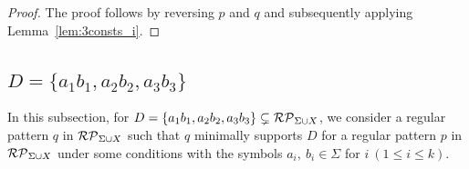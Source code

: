 \begin{proof}
%
%
The proof follows by reversing $p$ and $q$ and subsequently applying Lemma~\ref{lem:3consts_i}.
\end{proof}

\subsection{$D = \{ a_{1}b_{1}, a_{2}b_{2}, a_{3}b_{3}\}$}\label{subsec:d3c}

{\color{red}
In this subsection, for $D = \{ a_{1}b_{1}, a_{2}b_{2}, a_{3}b_{3}\} \subsetneq \mathcal{RP}_{\Sigma\cup X}$, we consider a regular pattern $q$ in $\mathcal{RP}_{\Sigma\cup X}$ 
such that $q$ minimally supports $D$ for a regular pattern $p$ in $\mathcal{RP}_{\Sigma\cup X}$
under some conditions with the symbols $a_i,~b_i \in \Sigma$ for $i~(1\leq i \leq k)$.
}


